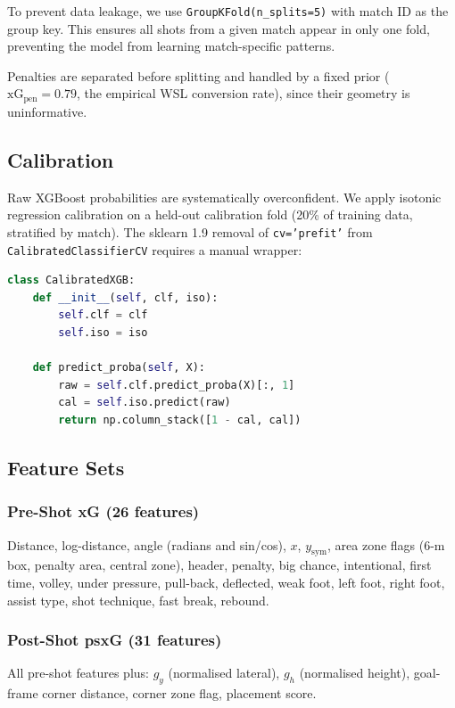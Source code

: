 \documentclass[12pt,a4paper]{article}
\begin{document}
To prevent data leakage, we use \texttt{GroupKFold(n\_splits=5)} with match ID as the group key. This ensures all shots from a given match appear in only one fold, preventing the model from learning match-specific patterns.

Penalties are separated before splitting and handled by a fixed prior ($\text{xG}_\text{pen} = 0.79$, the empirical WSL conversion rate), since their geometry is uninformative.

\subsection{Calibration}

Raw XGBoost probabilities are systematically overconfident. We apply isotonic regression calibration on a held-out calibration fold (20\% of training data, stratified by match). The sklearn 1.9 removal of \texttt{cv='prefit'} from \texttt{CalibratedClassifierCV} requires a manual wrapper:

\begin{lstlisting}[language=Python]
class CalibratedXGB:
    def __init__(self, clf, iso):
        self.clf = clf
        self.iso = iso

    def predict_proba(self, X):
        raw = self.clf.predict_proba(X)[:, 1]
        cal = self.iso.predict(raw)
        return np.column_stack([1 - cal, cal])
\end{lstlisting}

\subsection{Feature Sets}

\subsubsection{Pre-Shot xG (26 features)}

Distance, log-distance, angle (radians and sin/cos), $x$, $y_\text{sym}$, area zone flags (6-m box, penalty area, central zone), header, penalty, big chance, intentional, first time, volley, under pressure, pull-back, deflected, weak foot, left foot, right foot, assist type, shot technique, fast break, rebound.

\subsubsection{Post-Shot psxG (31 features)}

All pre-shot features plus: $g_y$ (normalised lateral), $g_h$ (normalised height), goal-frame corner distance, corner zone flag, placement score.
\end{document}

